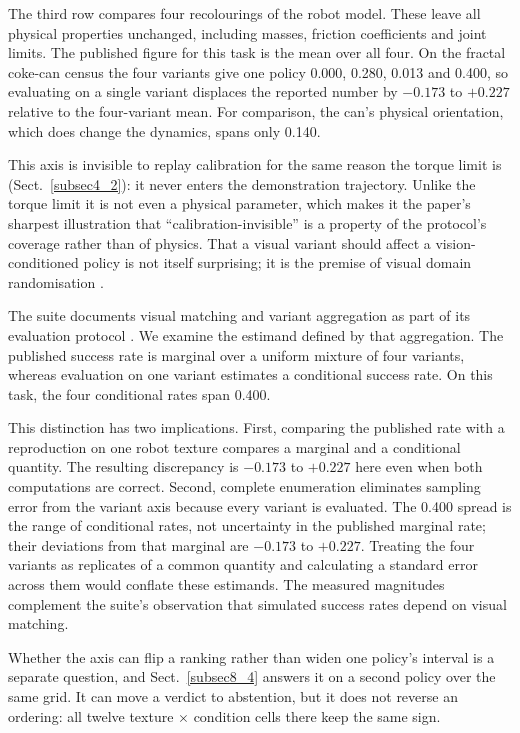 \documentclass[pdflatex,iicol,sn-apa]{sn-jnl}
\theoremstyle{remark}
\begin{document}
The third row compares four recolourings of the robot model. These leave all physical properties unchanged,
including masses, friction coefficients and joint limits. The published figure for this task is the mean over all four. On the fractal coke-can census
the four variants give one policy 0.000, 0.280, 0.013 and 0.400, so evaluating on a single variant
displaces the reported number by $-0.173$ to $+0.227$ relative to the four-variant mean. For
comparison, the can's physical orientation, which does change the dynamics, spans only 0.140.

This axis is invisible to replay calibration for the same reason the torque limit is
(Sect.~\ref{subsec4_2}): it never enters the demonstration trajectory. Unlike the torque limit it is
not even a physical parameter, which makes it the paper's sharpest illustration that
``calibration-invisible'' is a property of the protocol's coverage rather than of physics. That a
visual variant should affect a vision-conditioned policy is not itself surprising; it is the
premise of visual domain randomisation \citep{tobin2017domain}.

The suite documents visual matching and variant aggregation as part of its evaluation protocol
\citep{li2024simpler}. We examine the estimand defined by that aggregation. The published success
rate is marginal over a uniform mixture of four variants, whereas evaluation on one variant
estimates a conditional success rate. On this task, the four conditional rates span 0.400.

This distinction has two implications. First, comparing the published rate with a reproduction
on one robot texture compares a marginal and a conditional quantity. The resulting discrepancy
is $-0.173$ to $+0.227$ here even when both computations are correct. Second, complete enumeration
eliminates sampling error from the variant axis because every variant is evaluated. The
0.400 spread is the range of conditional rates, not uncertainty in the published marginal rate;
their deviations from that marginal are $-0.173$ to $+0.227$. Treating the four variants as
replicates of a common quantity and calculating a standard error across them would conflate
these estimands. The measured magnitudes complement the suite's observation that simulated
success rates depend on visual matching.

Whether the axis can flip a ranking rather than widen one policy's interval is a separate
question, and Sect.~\ref{subsec8_4} answers it on a second policy over the same grid. It can move a
verdict to abstention, but it does not reverse an ordering: all twelve texture $\times$ condition
cells there keep the same sign.
\end{document}
